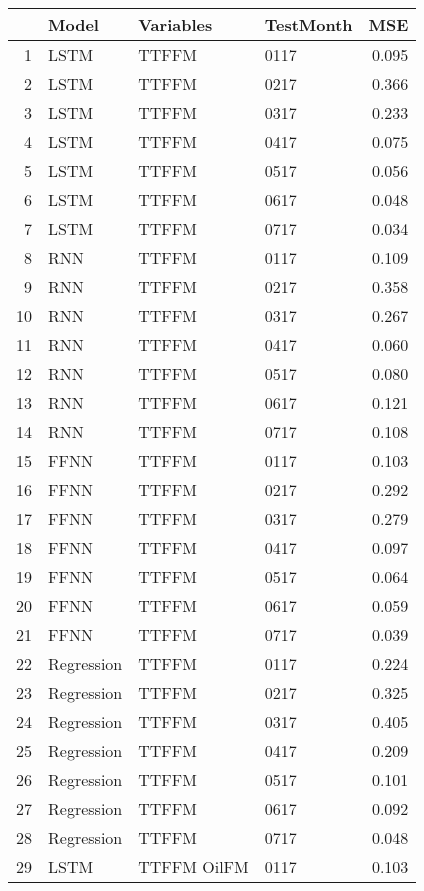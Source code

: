 \begin{table}[ht]
\centering
\begin{tabular}{rlllr}
  \hline
 & Model & Variables & TestMonth & MSE \\ 
  \hline
1 & LSTM & TTFFM  & 0117 & 0.095 \\ 
  2 & LSTM & TTFFM  & 0217 & 0.366 \\ 
  3 & LSTM & TTFFM  & 0317 & 0.233 \\ 
  4 & LSTM & TTFFM  & 0417 & 0.075 \\ 
  5 & LSTM & TTFFM  & 0517 & 0.056 \\ 
  6 & LSTM & TTFFM  & 0617 & 0.048 \\ 
  7 & LSTM & TTFFM  & 0717 & 0.034 \\ 
  8 & RNN & TTFFM  & 0117 & 0.109 \\ 
  9 & RNN & TTFFM  & 0217 & 0.358 \\ 
  10 & RNN & TTFFM  & 0317 & 0.267 \\ 
  11 & RNN & TTFFM  & 0417 & 0.060 \\ 
  12 & RNN & TTFFM  & 0517 & 0.080 \\ 
  13 & RNN & TTFFM  & 0617 & 0.121 \\ 
  14 & RNN & TTFFM  & 0717 & 0.108 \\ 
  15 & FFNN & TTFFM  & 0117 & 0.103 \\ 
  16 & FFNN & TTFFM  & 0217 & 0.292 \\ 
  17 & FFNN & TTFFM  & 0317 & 0.279 \\ 
  18 & FFNN & TTFFM  & 0417 & 0.097 \\ 
  19 & FFNN & TTFFM  & 0517 & 0.064 \\ 
  20 & FFNN & TTFFM  & 0617 & 0.059 \\ 
  21 & FFNN & TTFFM  & 0717 & 0.039 \\ 
  22 & Regression & TTFFM  & 0117 & 0.224 \\ 
  23 & Regression & TTFFM  & 0217 & 0.325 \\ 
  24 & Regression & TTFFM  & 0317 & 0.405 \\ 
  25 & Regression & TTFFM  & 0417 & 0.209 \\ 
  26 & Regression & TTFFM  & 0517 & 0.101 \\ 
  27 & Regression & TTFFM  & 0617 & 0.092 \\ 
  28 & Regression & TTFFM  & 0717 & 0.048 \\ 
  29 & LSTM & TTFFM OilFM & 0117 & 0.103 \\ 

\end{tabular}
\end{table}
